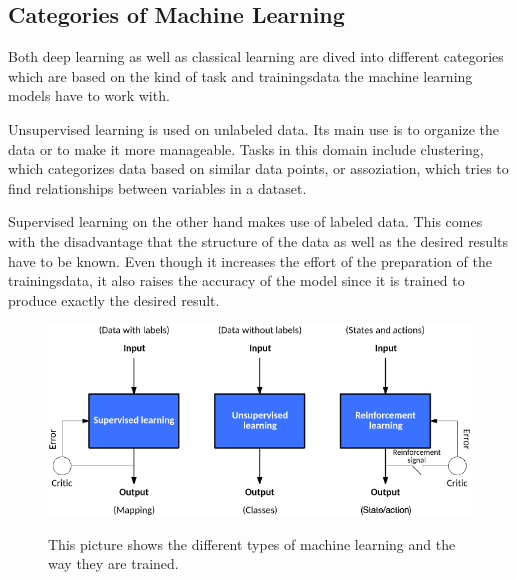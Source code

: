 
\subsection{Categories of Machine Learning}
Both deep learning as well as classical learning are dived into different categories which are based on the kind of task and trainingsdata the machine learning models have to work with.

Unsupervised learning is used on unlabeled data. Its main use is to organize the data or to make it more manageable. Tasks in this domain include clustering, which categorizes data based on similar data points, or assoziation, which tries to find relationships between variables in a dataset\cite{supervised-unsupervised-learning}.

Supervised learning on the other hand makes use of labeled data. This comes with the disadvantage that the structure of the data as well as the desired results have to be known\cite{classical-ml}. Even though it increases the effort of the preparation of the trainingsdata, it also raises the accuracy of the model since it is trained to produce exactly the desired result.



\begin{figure}[ht]
  \caption[Different kinds of machine learning]{This picture shows the different types of machine learning and the way they are trained\cite{types-of-ml}.} %
  \centering
  \includegraphics[width=\linewidth]{img/types_of_machine_learning.png}\label{fig:kinds_of_ml}
\end{figure}
